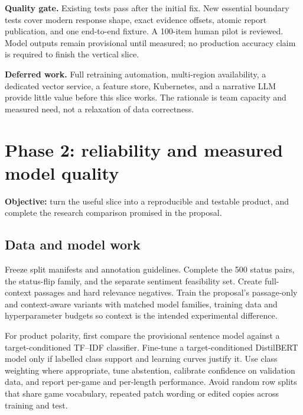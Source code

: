 \documentclass[10pt,letterpaper]{article}
\newcommand{\key}[1]{\textbf{\color{ink}#1}}
\newcommand{\nextsection}[1]{\clearpage\section{#1}}
\begin{document}
\key{Quality gate.} Existing tests pass after the initial fix. New essential boundary tests cover modern response shape, exact evidence offsets, atomic report publication, and one end-to-end fixture. A 100-item human pilot is reviewed. Model outputs remain provisional until measured; no production accuracy claim is required to finish the vertical slice.

\key{Deferred work.} Full retraining automation, multi-region availability, a dedicated vector service, a feature store, Kubernetes, and a narrative LLM provide little value before this slice works. The rationale is team capacity and measured need, not a relaxation of data correctness.

\nextsection{Phase 2: reliability and measured model quality}
\key{Objective:} turn the useful slice into a reproducible and testable product, and complete the research comparison promised in the proposal.

\subsection{Data and model work}
Freeze split manifests and annotation guidelines. Complete the 500 status pairs, the status-flip family, and the separate sentiment feasibility set. Create full-context passages and hard relevance negatives. Train the proposal's passage-only and context-aware variants with matched model families, training data and hyperparameter budgets so context is the intended experimental difference.

For product polarity, first compare the provisional sentence model against a target-conditioned TF--IDF classifier. Fine-tune a target-conditioned DistilBERT model only if labelled class support and learning curves justify it. Use class weighting where appropriate, tune abstention, calibrate confidence on validation data, and report per-game and per-length performance. Avoid random row splits that share game vocabulary, repeated patch wording or edited copies across training and test.
\end{document}

